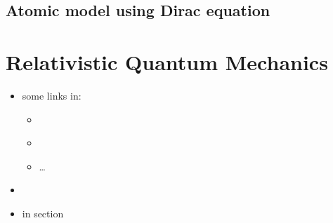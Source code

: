 \documentclass[letterpaper,10pt,english]{jupyterBook}
\begin{document}
\sphinxstepscope


\section{Atomic model using Dirac equation}
\label{\detokenize{ch/quantum-mechanics/atom-models/dirac:atomic-model-using-dirac-equation}}\label{\detokenize{ch/quantum-mechanics/atom-models/dirac:quantum-mechanics-atom-models-dirac}}\label{\detokenize{ch/quantum-mechanics/atom-models/dirac::doc}}
\sphinxstepscope


\chapter{Relativistic Quantum Mechanics}
\label{\detokenize{ch/quantum-mechanics/relativistic-qm:relativistic-quantum-mechanics}}\label{\detokenize{ch/quantum-mechanics/relativistic-qm:quantum-mechanics-relativistic}}\label{\detokenize{ch/quantum-mechanics/relativistic-qm::doc}}\begin{itemize}
\item {} 
\sphinxAtStartPar
{} \sphinxhyphen{} some links in:
\begin{itemize}
\item {} 
\sphinxAtStartPar
{\hyperref[\detokenize{ch/quantum-mechanics/history/spin:quantum-mechanics-history-spin}]{}}

\item {} 
\sphinxAtStartPar
{\hyperref[\detokenize{ch/quantum-mechanics/angular-momentum:quantum-mechanics-angular-momentum}]{}}

\item {} 
\sphinxAtStartPar
…

\end{itemize}

\item {} 
\sphinxAtStartPar
{\hyperref[\detokenize{ch/quantum-mechanics/relativistic-qm/dirac-equation:quantum-mechanics-relativistic-dirac-equation}]{}}

\item {} 
\sphinxAtStartPar
{\hyperref[\detokenize{ch/quantum-mechanics/atom-models/dirac:quantum-mechanics-atom-models-dirac}]{}} \sphinxhyphen{} in  section

\end{itemize}
\end{document}
